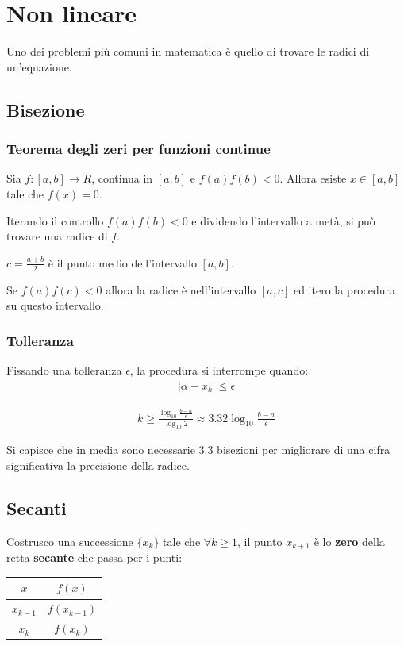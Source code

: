 \chapter{Non lineare}
Uno dei problemi pi\`u comuni in matematica \`e quello di trovare le radici di un'equazione.

\section{Bisezione}

\subsection{Teorema degli zeri per funzioni continue}
Sia $f : [a, b] \rightarrow R$, continua in $[a, b]$ e $f(a)f(b) < 0$. Allora esiste $x \in [a, b]$ tale che $f(x) = 0$.



Iterando il controllo $f(a)f(b) < 0$ e dividendo l'intervallo a met\`a, si pu\`o trovare una radice di $f$.

$c = \frac{a+b}{2}$ \`e il punto medio dell'intervallo $[a, b]$.

Se $f(a)f(c) < 0$ allora la radice \`e nell'intervallo $[a, c]$ ed itero la procedura su questo intervallo.




\subsection{Tolleranza}
Fissando una tolleranza $\epsilon$, la procedura si interrompe quando:
\begin{align}
  | \alpha - x_k | \leq \epsilon
\end{align}

\begin{align}
  k \geq \frac{\log_{10} \frac{b-a}{\epsilon}}{\log_{10} 2} \approx 3.32 \log_{10} \frac{b-a}{\epsilon}
\end{align}

Si capisce che in media sono necessarie 3.3 bisezioni per migliorare di una cifra significativa la precisione della radice.


\newpage
\section{Secanti}

Costrusco una successione $\{x_k\}$ tale che $\forall k \geq 1$, il punto $x_{k+1}$ \`e lo \textbf{zero} della
retta \textbf{secante} che passa per i punti:
\begin{center}
  \begin{tabular}{| c | c |}
  \hline
    $x$ & $f(x)$ \\
  \hline
    $x_{k-1}$ & $f(x_{k-1})$ \\
    $x_k$ & $f(x_k)$ \\
  \hline
  \end{tabular}
\end{center}


